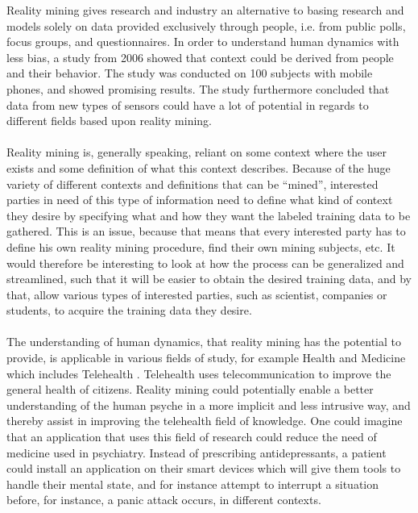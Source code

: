 \begin{table}[!htbp]
Reality mining gives research and industry an alternative to basing research and models solely on data provided exclusively through people, i.e. from public polls, focus groups, and questionnaires. In order to understand human dynamics with less bias, a study from 2006 \parencite{eagle2006_reality_mining_definition} showed that context could be derived from people and their behavior. The study was conducted on 100 subjects with mobile phones, and showed promising results. The study furthermore concluded that data from new types of sensors could have a lot of potential in regards to different fields based upon reality mining. 
\\\\
Reality mining is, generally speaking, reliant on some context where the user exists and some definition of what this context describes. Because of the huge variety of different contexts and definitions that can be ``mined'', interested parties in need of this type of information need to define what kind of context they desire by specifying what and how they want the labeled training data to be gathered. This is an issue, because that means that every interested party has to define his own reality mining procedure, find their own mining subjects, etc. It would therefore be interesting to look at how the process can be generalized and streamlined, such that it will be easier to obtain the desired training data, and by that, allow various types of interested parties, such as scientist, companies or students, to acquire the training data they desire.
\\\\
The understanding of human dynamics, that reality mining has the potential to provide, is applicable in various fields of study, for example Health and Medicine \parencite{pentland2009_reality_mining_health_medicine} which includes Telehealth \parencite{telehealth_aau}. Telehealth uses telecommunication to improve the general health of citizens. Reality mining could potentially enable a better understanding of the human psyche in a more implicit and less intrusive way, and thereby assist in improving the telehealth field of knowledge. One could imagine that an application that uses this field of research could reduce the need of medicine used in psychiatry. Instead of prescribing antidepressants, a patient could install an application on their smart devices which will give them tools to handle their mental state, and for instance attempt to interrupt a situation before, for instance, a panic attack occurs, in different contexts. 

\end{table}
